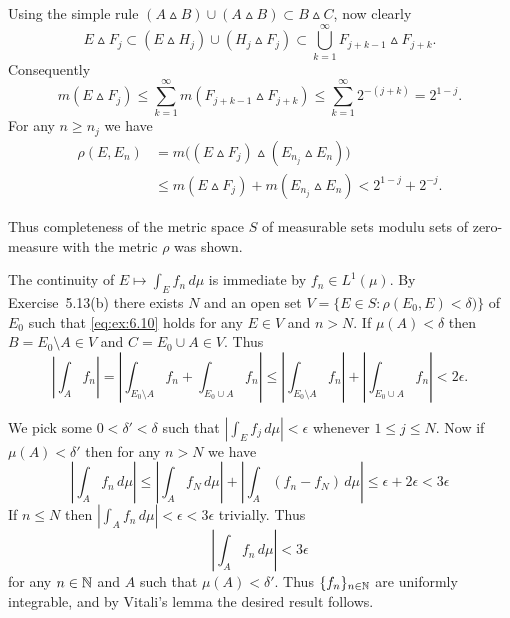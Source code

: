 \begin{enumerate}
\begin{itemize}
Using the simple rule
\((A\vartriangle B) \cup (A\vartriangle B) \subset B\vartriangle C \),
now clearly
\begin{equation*}
E\vartriangle  F_j
\subset (E\vartriangle H_j)\cup (H_j\vartriangle F_j)
\subset \bigcup_{k=1}^\infty F_{j+k-1} \vartriangle F_{j+k}.
\end{equation*}
Consequently
\begin{equation*}
m(E\vartriangle  F_j)
\leq \sum_{k=1}^\infty m(F_{j+k-1} \vartriangle F_{j+k})
\leq \sum_{k=1}^\infty 2^{-(j+k)} = 2^{1-j}.
\end{equation*}
For any \(n\geq n_j\) we have
\begin{align*}
\rho(E,E_n) 
&= m\bigl((E\vartriangle F_j) \vartriangle
          (E_{n_j}\vartriangle E_n)\bigr) \\
&\leq m(E\vartriangle F_j) + m(E_{n_j}\vartriangle E_n) 
< 2^{1-j}+2^{-j}.
\end{align*}

Thus completeness of the metric space $S$ of measurable sets 
modulu sets of zero-measure with the metric \(\rho\) was shown.

The continuity of \(E\mapsto \int_E f_n\,d\mu\) is immediate
by \(f_n\in L^1(\mu)\).
By Exercise~5.13(b) there exists $N$ and  an open set 
\(V = \{E\in S: \rho(E_0,E) < \delta)\}\)
of \(E_0\) such that \eqref{eq:ex:6.10} holds for any \(E\in V\) and \(n>N\).
If \(\mu(A)<\delta\) then \(B = E_0 \setminus A\in V\)
and \(C = E_0 \cup A\in V\).
Thus
\begin{equation*}
\left|\int_A f_n\right| 
= \left|\int_{E_0\setminus A} f_n + \int_{E_0\cup A} f_n\right| 
\leq \left|\int_{E_0\setminus A} f_n\right| + \left|\int_{E_0\cup A} f_n\right| 
< 2\epsilon.
\end{equation*}

We pick some \(0<\delta'<\delta\) such that
\(|\int_E f_j\,d\mu| < \epsilon\) whenever \(1\leq j \leq N\).
Now if \(\mu(A)<\delta'\) then
for any \(n>N\) we have
\begin{equation*}
\left|\int_A f_n\,d\mu\right|
\leq \left|\int_A f_N\,d\mu\right| + \left|\int_A (f_n - f_N)\,d\mu\right|
\leq \epsilon + 2\epsilon < 3\epsilon
\end{equation*}
If \(n\leq N\) then \(|\int_A f_n\,d\mu| < \epsilon < 3\epsilon\) trivially.
Thus
\begin{equation*}
\left|\int_A f_n\,d\mu\right| < 3\epsilon
\end{equation*}
for any \(n\in\mathbb{N}\) and $A$ such that \(\mu(A) < \delta'\).
Thus \(\{f_n\}_{n\in\mathbb{N}}\) are uniformly integrable, and by Vitali's lemma
the desired result follows.
\end{itemize}



\end{enumerate}
